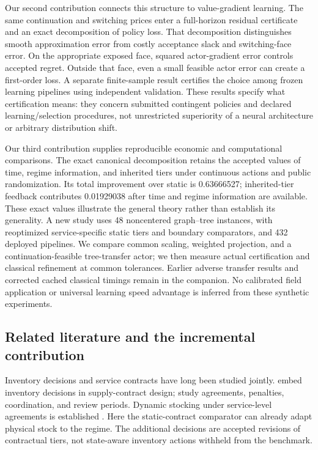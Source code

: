 \documentclass[11pt,letterpaper]{article}
\theoremstyle{definition}
\newcommand{\1}{\mathbf 1}
\begin{document}
Our second contribution connects this structure to value-gradient learning. The same continuation and switching prices enter a full-horizon residual certificate and an exact decomposition of policy loss. That decomposition distinguishes smooth approximation error from costly acceptance slack and switching-face error. On the appropriate exposed face, squared actor-gradient error controls accepted regret. Outside that face, even a small feasible actor error can create a first-order loss. A separate finite-sample result certifies the choice among frozen learning pipelines using independent validation. These results specify what certification means: they concern submitted contingent policies and declared learning/selection procedures, not unrestricted superiority of a neural architecture or arbitrary distribution shift.

Our third contribution supplies reproducible economic and computational comparisons. The exact canonical decomposition retains the accepted values of time, regime information, and inherited tiers under continuous actions and public randomization. Its total improvement over static is 0.63666527; inherited-tier feedback contributes 0.01929038 after time and regime information are available. These exact values illustrate the general theory rather than establish its generality. A new study uses 48 noncentered graph--tree instances, with reoptimized service-specific static tiers and boundary comparators, and 432 deployed pipelines. We compare common scaling, weighted projection, and a continuation-feasible tree-transfer actor; we then measure actual certification and classical refinement at common tolerances. Earlier adverse transfer results and corrected cached classical timings remain in the companion. No calibrated field application or universal learning speed advantage is inferred from these synthetic experiments.

\subsection{Related literature and the incremental contribution}
Inventory decisions and service contracts have long been studied jointly. \citet{Henig1997} embed inventory decisions in supply-contract design; \citet{LiangAtkins2013,Sieke2012,Katok2008} study agreements, penalties, coordination, and review periods. Dynamic stocking under service-level agreements is established \citep{Hosseinifard2022,Caggiano2007,Abbasi2022}. Here the static-contract comparator can already adapt physical stock to the regime. The additional decisions are accepted revisions of contractual tiers, not state-aware inventory actions withheld from the benchmark.
\end{document}
